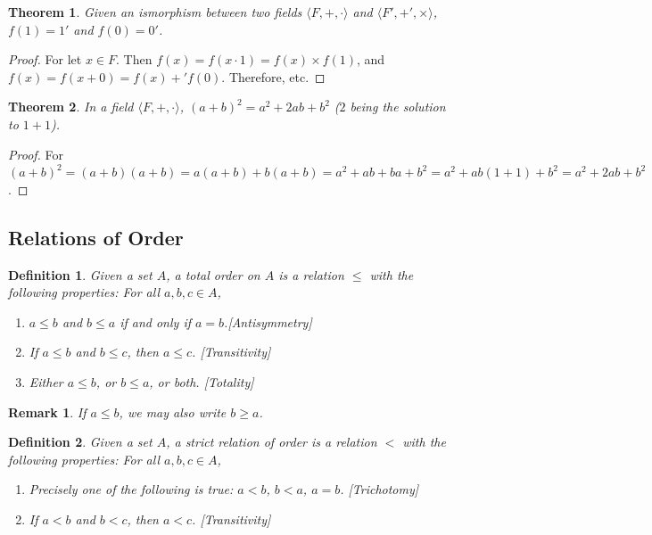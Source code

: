 \documentclass[12pt,oneside]{book}
\theoremstyle{mystyle}
\newtheorem{theorem}{Theorem}[section]
\newtheorem{definition}{Definition}[section]
\newtheorem{remark}{Remark}[section]
\begin{document}
\begin{theorem}
Given an ismorphism between two fields $\langle F,+,\cdot \rangle$ and $\langle F', +',\times \rangle$, $f(1) = 1'$ and $f(0) = 0'$.
\end{theorem}
\begin{proof}
For let $x\in F$. Then $f(x)=f(x\cdot 1) = f(x)\times f(1)$, and $f(x)=f(x+0) = f(x)+'f(0)$. Therefore, etc.
\end{proof}

\begin{theorem}
In a field $\langle F,+,\cdot \rangle$, $(a+ b)^2 = a^2 + 2ab + b^2$ ($2$ being the solution to $1+1$).
\end{theorem}
\begin{proof}
For $(a+b)^2 = (a+b)(a+b) = a(a+b)+b(a+b) = a^2 + ab + ba + b^2 = a^2 +ab(1+1)+b^2 = a^2 + 2ab + b^2$.
\end{proof}
%
\subsection{Relations of Order}
%
\begin{definition}
Given a set $A$, a total order on $A$ is a relation $\leq$ with the following properties: For all $a,b,c\in A$,
\begin{enumerate}
\item $a\leq b$ and $b\leq a$ if and only if $a=b$.\hfill [Antisymmetry]
\item If $a\leq b$ and $b\leq c$, then $a\leq c$. \hfill [Transitivity]
\item Either $a\leq b$, or $b\leq a$, or both. \hfill [Totality]
\end{enumerate}
\end{definition}

\begin{remark}
If $a\leq b$, we may also write $b\geq a$.
\end{remark}

\begin{definition}
Given a set $A$, a strict relation of order is a relation $<$ with the following properties: For all $a,b,c\in A$,
\begin{enumerate}
\item Precisely one of the following is true: $a<b$, $b<a$, $a=b$. \hfill [Trichotomy]
\item If $a<b$ and $b<c$, then $a<c$. \hfill [Transitivity]
\end{enumerate}
\end{definition}
\end{document}
